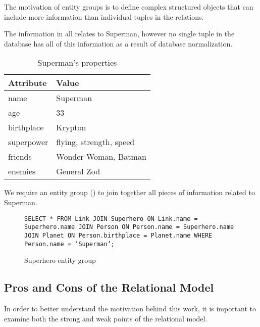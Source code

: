 		The motivation of entity groups is to define complex structured objects that can include more information than individual tuples in the relations.
		
		\begin{ex}
			The information in  all relates to Superman, however no single tuple in the database has all of this information as a result of database normalization.
			
			\begin{table}[!ht]
				\centering
				
				\begin{tabular}{ll}
					\toprule
					Attribute & Value \\
					\midrule
					name & Superman \\
					age & 33 \\
					birthplace & Krypton \\
					superpower & flying, strength, speed \\
					friends & Wonder Woman, Batman \\
					enemies & General Zod \\
					\bottomrule
				\end{tabular}
				
				\caption{Superman's properties}
				\label{tbl:superman-properties}
			\end{table}
			
			We require an entity group () to join together all pieces of information related to Superman.
			
			\begin{figure}[!ht]
				\texttt{SELECT * FROM Link JOIN Superhero ON Link.name = Superhero.name JOIN Person ON Person.name = Superhero.name JOIN Planet ON Person.birthplace = Planet.name WHERE Person.name = 'Superman';}
				
				\caption{Superhero entity group}
				\label{fig:superhero-entity-group}
			\end{figure}

		\end{ex}

	\subsection{Pros and Cons of the Relational Model}
		In order to better understand the motivation behind this work, it is important to examine both the strong and weak points of the relational model.
		

